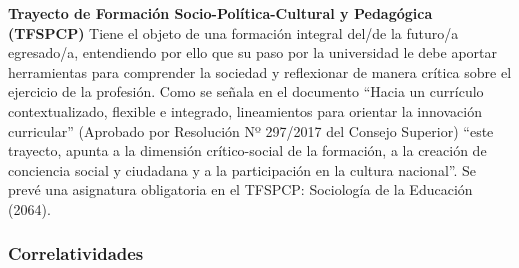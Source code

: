 \documentclass[a4paper, 12pt]{article}
\begin{document}
\begin{description}
\item{\textbf{Trayecto de Formación Socio-Política-Cultural y Pedagógica (TFSPCP)}}  Tiene el objeto de una formación integral del/de la futuro/a egresado/a,  entendiendo por ello que su paso por la universidad le debe aportar herramientas para comprender la sociedad y reflexionar de manera crítica sobre el ejercicio de la profesión. Como se señala en el documento  ``Hacia un currículo contextualizado, 
flexible e integrado, lineamientos para orientar la innovación curricular'' (Aprobado por Resolución Nº 297/2017 del Consejo Superior) ``este trayecto, apunta a la dimensión crítico-social de la formación, a la creación de conciencia social y ciudadana y a la participación en la cultura nacional''. Se prevé una asignatura obligatoria en el   TFSPCP:  Sociología de la Educación (2064).







\end{description}



\subsubsection{Correlatividades}
 
\end{document}

